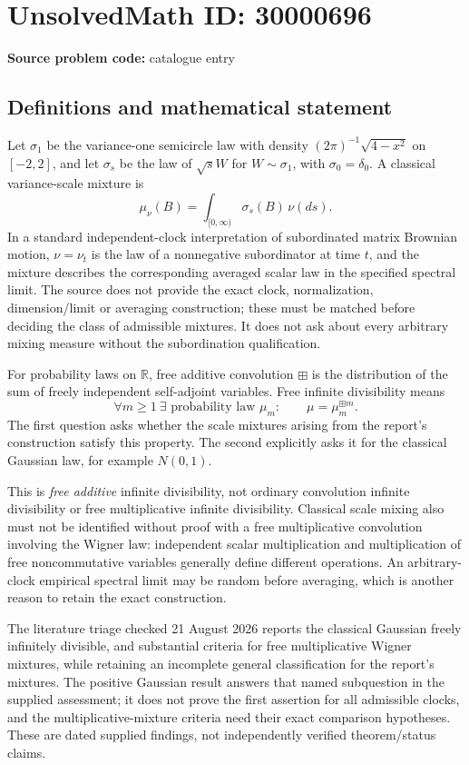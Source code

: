 \documentclass[11pt]{article}
\newcommand{\R}{\mathbb{R}}
\begin{document}
\section*{UnsolvedMath ID: 30000696}
\textbf{Source problem code:} catalogue entry
\subsection{Definitions and mathematical statement}
Let $\sigma_1$ be the variance-one semicircle law with density $(2\pi)^{-1}\sqrt{4-x^2}$ on $[-2,2]$, and let $\sigma_s$ be the law of $\sqrt{s}W$ for $W\sim\sigma_1$, with $\sigma_0=\delta_0$. A classical variance-scale mixture is
\[
 \mu_\nu(B)=\int_{[0,\infty)}\sigma_s(B)\,\nu(ds).
\]
In a standard independent-clock interpretation of subordinated matrix Brownian motion, $\nu=\nu_t$ is the law of a nonnegative subordinator at time $t$, and the mixture describes the corresponding averaged scalar law in the specified spectral limit. The source does not provide the exact clock, normalization, dimension/limit or averaging construction; these must be matched before deciding the class of admissible mixtures. It does not ask about every arbitrary mixing measure without the subordination qualification.

For probability laws on $\R$, free additive convolution $\boxplus$ is the distribution of the sum of freely independent self-adjoint variables. Free infinite divisibility means
\[
 \forall m\geq1\ \exists\text{ probability law }\mu_m:\qquad
                         \mu=\mu_m^{\boxplus m}.
\]
The first question asks whether the scale mixtures arising from the report's construction satisfy this property. The second explicitly asks it for the classical Gaussian law, for example $N(0,1)$.

This is \emph{free additive} infinite divisibility, not ordinary convolution infinite divisibility or free multiplicative infinite divisibility. Classical scale mixing also must not be identified without proof with a free multiplicative convolution involving the Wigner law: independent scalar multiplication and multiplication of free noncommutative variables generally define different operations. An arbitrary-clock empirical spectral limit may be random before averaging, which is another reason to retain the exact construction.

The literature triage checked 21 August 2026 reports the classical Gaussian freely infinitely divisible, and substantial criteria for free multiplicative Wigner mixtures, while retaining an incomplete general classification for the report's mixtures. The positive Gaussian result answers that named subquestion in the supplied assessment; it does not prove the first assertion for all admissible clocks, and the multiplicative-mixture criteria need their exact comparison hypotheses. These are dated supplied findings, not independently verified theorem/status claims.
\end{document}
